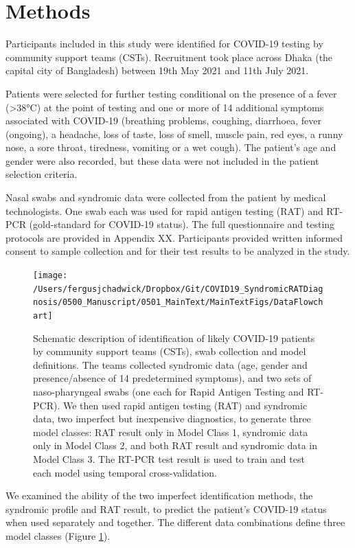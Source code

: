 \documentclass[]{elsarticle} %
\begin{document}
\hypertarget{methods}{%
\section{Methods}\label{methods}}

Participants included in this study were identified for COVID-19 testing by community support teams (CSTs).
Recruitment took place across Dhaka (the capital city of Bangladesh) between 19th May 2021 and 11th July 2021.

Patients were selected for further testing conditional on the presence of a fever (\textgreater38°C) at the point of testing and one or more of 14 additional symptoms associated with COVID-19 (breathing problems, coughing, diarrhoea, fever (ongoing), a headache, loss of taste, loss of smell, muscle pain, red eyes, a runny nose, a sore throat, tiredness, vomiting or a wet cough).
The patient's age and gender were also recorded, but these data were not included in the patient selection criteria.

Nasal swabs and syndromic data were collected from the patient by medical technologists.
One swab each was used for rapid antigen testing (RAT) and RT-PCR (gold-standard for COVID-19 status).
The full questionnaire and testing protocols are provided in Appendix XX.
Participants provided written informed consent to sample collection and for their test results to be analyzed in the study.

\begin{figure}
\texttt{[image: /Users/fergusjchadwick/Dropbox/Git/COVID19\_SyndromicRATDiagnosis/0500\_Manuscript/0501\_MainText/MainTextFigs/DataFlowchart]} \caption{Schematic description of identification of likely COVID-19 patients by community support teams (CSTs), swab collection and model definitions. The teams collected syndromic data (age, gender and presence/absence of 14 predetermined symptoms), and two sets of naso-pharyngeal swabs (one each for Rapid Antigen Testing and RT-PCR). We then used rapid antigen testing (RAT) and syndromic data, two imperfect but inexpensive diagnostics, to generate three model classes: RAT result only in Model Class 1, syndromic data only in Model Class 2, and both RAT result and syndromic data in Model Class 3. The RT-PCR test result is used to train and test each model using temporal cross-validation.}\label{fig:data-flowchart}
\end{figure}

We examined the ability of the two imperfect identification methods, the syndromic profile and RAT result, to predict the patient's COVID-19 status when used separately and together.
The different data combinations define three model classes (Figure \ref{fig:data-flowchart}).
\end{document}
